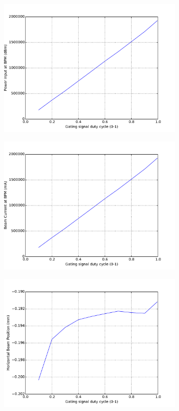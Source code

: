 \documentclass[a4paper, 11pt]{article}%
\begin{document}
\begin{figure}[htbp]%
\centering%
\includegraphics[width=0.8\textwidth]{./Results/DC_vs_power.pdf}%
\caption{}%
\end{figure}

%


\begin{figure}[htbp]%
\centering%
\includegraphics[width=0.8\textwidth]{./Results/DC_vs_current.pdf}%
\caption{}%
\end{figure}

%


\begin{figure}[htbp]%
\centering%
\includegraphics[width=0.8\textwidth]{./Results/DC_vs_X.pdf}%
\caption{}%
\end{figure}
\end{document}
